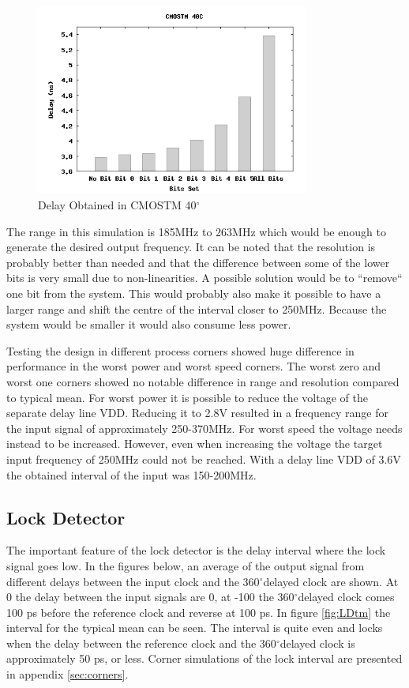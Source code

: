 \documentclass[a4paper,12pt]{article} \usepackage{graphicx}
\newcommand{\degree}{\ensuremath{^\circ}}
\begin{document}
\begin{figure}[h]
    \centering
    \includegraphics[width=0.8\textwidth]{../Bilder/Layout/simulations/delayCMOSTM40.png}
    \caption{Delay Obtained in CMOSTM 40\degree}
    \label{fig:del_bit}
\end{figure}

The range in this simulation is 185MHz to 263MHz which would be enough to
generate the desired output frequency. It can be noted that the resolution is
probably better than needed and that the difference between some of the lower
bits is very small due to non-linearities. A possible solution would be to
``remove`` one bit from the system. This would probably also make it possible to
have a larger range and shift the centre of the interval closer to 250MHz.
Because the system would be smaller it would also consume less power.

Testing the design in different process corners showed huge difference in
performance in the worst power and worst speed corners. The worst zero and worst
one corners showed no notable difference in range and resolution compared to typical
mean. For worst power it is possible to reduce the voltage of the separate delay
line VDD. Reducing it to 2.8V resulted in a frequency range for the input signal
of approximately 250-370MHz. For worst speed the voltage needs instead to be
increased. However, even when increasing the voltage the target input frequency
of 250MHz could not be reached. With a delay line VDD of 3.6V the obtained
interval of the input was 150-200MHz.   



\subsection{Lock Detector}
The important feature of the lock detector is the delay interval where
the lock signal goes low. In the figures below, an average of the
output signal from different delays between the input clock and the
360\degree delayed clock are shown. At 0 the delay between the input
signals are 0, at -100 the 360\degree delayed clock comes 100 ps
before the reference clock and reverse at 100 ps. In figure
\ref{fig:LDtm} the interval for the typical mean can be seen. The interval 
is quite even and locks when the delay between the reference
clock and the 360\degree delayed clock is approximately 50 ps, or
less. Corner simulations of the lock interval are presented in
appendix \ref{sec:corners}.
\end{document}
